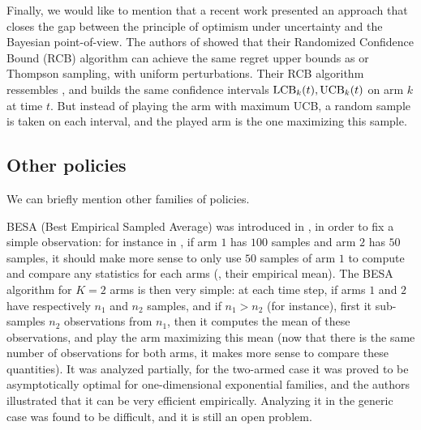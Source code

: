 Finally, we would like to mention that a recent work \cite{KimTewari2019} presented an approach that closes the gap between the principle of optimism under uncertainty and the Bayesian point-of-view.
The authors of \cite{KimTewari2019} showed that their Randomized Confidence Bound (RCB) algorithm can achieve the same regret upper bounds as \UCB{} or Thompson sampling, with uniform perturbations.
Their RCB algorithm ressembles \UCB, and builds the same confidence intervals $\mathrm{LCB}_k(t), \mathrm{UCB}_k(t)$ on arm $k$ at time $t$. But instead of playing the arm with maximum UCB, a random sample is taken on each interval, and the played arm is the one maximizing this sample.


\subsection{Other policies}

We can briefly mention other families of policies.



BESA (Best Empirical Sampled Average) was introduced in \cite{Baransi2014}, in order to fix a simple observation:
for instance in \UCB, if arm $1$ has $100$ samples and arm $2$ has $50$ samples, it should make more sense to only use $50$ samples of arm $1$ to compute and compare any statistics for each arms (\eg, their empirical mean).
The BESA algorithm for $K=2$ arms is then very simple: at each time step, if arms $1$ and $2$ have respectively $n_1$ and $n_2$ samples, and if $n_1>n_2$ (for instance), first it sub-samples $n_2$ observations from $n_1$, then it computes the mean of these observations, and play the arm maximizing this mean (now that there is the same number of observations for both arms, it makes more sense to compare these quantities).
It was analyzed partially, for the two-armed case it was proved to be asymptotically optimal for one-dimensional exponential families, and the authors illustrated that it can be very efficient empirically.
Analyzing it in the generic case was found to be difficult, and it is still an open problem.


